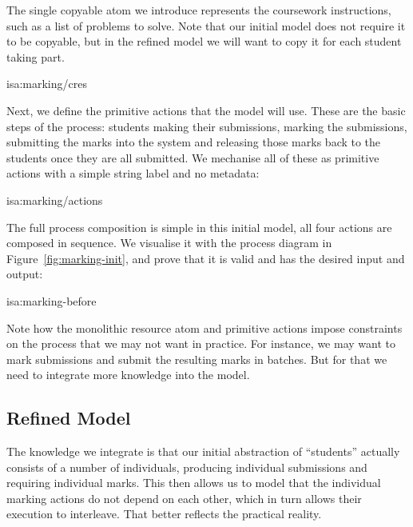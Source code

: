 \documentclass[class=smolathesis,crop=false]{standalone}
\begin{document}
The single copyable atom we introduce represents the coursework instructions, such as a list of problems to solve.
Note that our initial model does not require it to be copyable, but in the refined model we will want to copy it for each student taking part.
\begin{isadef}{isa:marking/cres}
  
\end{isadef}

Next, we define the primitive actions that the model will use.
These are the basic steps of the process: students making their submissions, marking the submissions, submitting the marks into the system and releasing those marks back to the students once they are all submitted.
We mechanise all of these as primitive actions with a simple string label and no metadata:
\begin{isadef}{isa:marking/actions}
  
\item
  
\item
  
\item
  
\end{isadef}

The full process composition is simple in this initial model, all four actions are composed in sequence.
We visualise it with the process diagram in Figure~\ref{fig:marking-init}, and prove that it is valid and has the desired input and output:
\begin{isalemma}{isa:marking-before}
  
\end{isalemma}

Note how the monolithic resource atom and primitive actions impose constraints on the process that we may not want in practice.
For instance, we may want to mark submissions and submit the resulting marks in batches.
But for that we need to integrate more knowledge into the model.

\subsection{Refined Model}
\label{sec:cases/marking/ref}

The knowledge we integrate is that our initial abstraction of ``students'' actually consists of a number of individuals, producing individual submissions and requiring individual marks.
This then allows us to model that the individual marking actions do not depend on each other, which in turn allows their execution to interleave.
That better reflects the practical reality.
\end{document}
